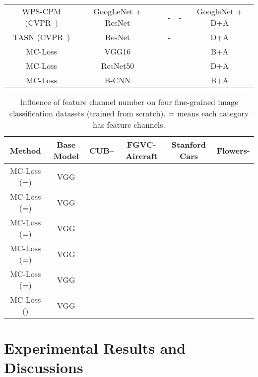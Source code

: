 \documentclass[journal]{IEEEtran}
\begin{document}
\begin{table*}[!t]
\begin{tabular}{|c|c|c|c|c|c|}
    WPS-CPM (CVPR~\cite{Ge_2019_CVPR})       & GoogLeNet + ResNet     &                &      -                        & -                  & GoogleNet + D+A \\
    TASN (CVPR~\cite{Zheng_2019_CVPR})       & ResNet                 &    &      -                        &                   &  D+A \\
    \hline
    \hline
    MC-Loss                                      & VGG16                      &                         &                         &  & B+A \\
    MC-Loss                                      & ResNet50                   &                         &    &  & D+A \\   
    MC-Loss                                      & B-CNN                      &                         &                &  & B+A \\
    \hline
    \end{tabular}\label{tab:SOTA}\end{table*}




\begin{table*}[!t]
  \centering
  \small
\caption{Influence of feature channel number on four fine-grained image classification datasets (trained from scratch). = means each category has  feature channels.}
    \begin{tabular}{|c|c|c|c|c|c|}
    \hline
    Method              & Base Model   & CUB-- & FGVC-Aircraft     & Stanford Cars   & Flowers- \\
    \hline
    \hline
    MC-Loss (=) & VGG      &           &            &           &  \\
MC-Loss (=) & VGG      &           &            &           &  \\
MC-Loss (=) & VGG      &  &   &  &  \\
MC-Loss (=) & VGG      &           &            &           &  \\
MC-Loss (=) & VGG      &           &            &           &  \\
    \hline
    \hline
    MC-Loss ()     & VGG      &          &            &         &  \\
    \hline
    \end{tabular}\label{tab:mis_match}\end{table*}



\section{Experimental Results and Discussions}\label{Experiments}
\end{document}
